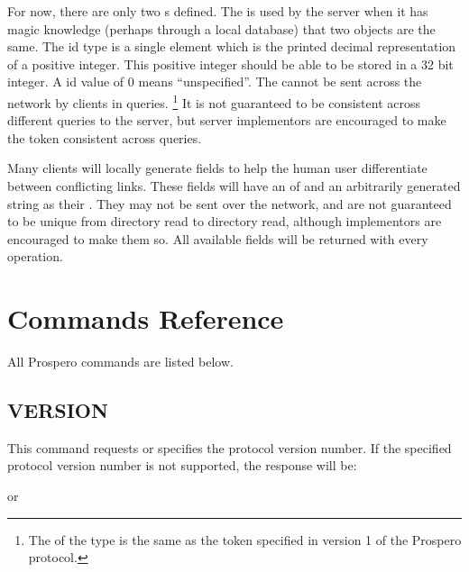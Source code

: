 For now, there are only two s defined.  The 
 is used by the server when it has magic
knowledge (perhaps through a local database) that
two objects are the same.  The   id type is a single
element which is the printed decimal representation of a positive
integer.  This positive integer should be able to be stored in a 32
bit integer.  A  id value of 0 means ``unspecified''.
The  
 cannot be sent across the network by clients in
queries.%
\footnote{The  of the  type
is the same as the  token specified in version 1 of the
Prospero protocol.}  It is not guaranteed to be consistent across different 
queries to the server, but server implementors are encouraged to make
the  token consistent across queries. 

Many clients will locally generate  fields to
help the human user differentiate between conflicting links.  These
 fields will have an  of  and an
arbitrarily generated string as their .  They may not be
sent over the network, and are not guaranteed to be unique from
directory read to directory read, although implementors are encouraged
to make them so.  All available  fields will be returned with
every  operation.  

\chapter{Commands Reference}

All Prospero commands are listed below.

\section{VERSION}

\begin{command}
 \commandsize {}  
	\zoos{}\zooe
\end{command}

This command requests or specifies the protocol version number.  If
the specified protocol version number is not supported, the response
will be:

\begin{command}
  \lit{-}
\end{command}
or
\begin{command}
   
\end{command}



